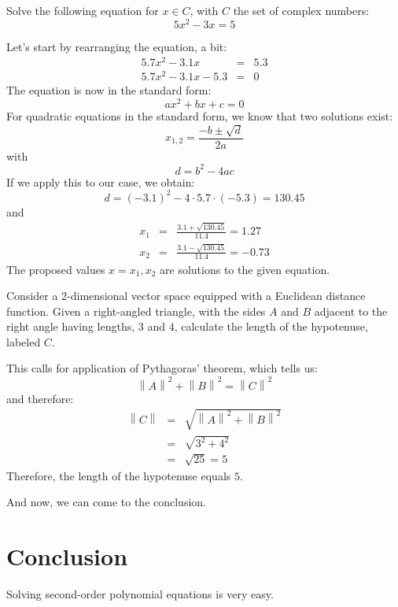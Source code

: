\documentclass[a4paper,10pt]{article}
\begin{document}
\begin{exercises}[columns = 2]

  \begin{exercise}
    \label{ex:1}
    Solve the following equation for $x \in C$, with $C$ the set of
    complex numbers:
    \begin{equation}
      5 x^2 -3 x = 5
    \end{equation}
  \end{exercise}
  \begin{solution}
    Let's start by rearranging the equation, a bit:
    \begin{eqnarray}
      5.7 x^2 - 3.1 x &=& 5.3\\
      5.7 x^2 - 3.1 x -5.3 &=& 0
    \end{eqnarray}
    The equation is now in the standard form:
    \begin{equation}
      a x^2 + b x + c = 0
    \end{equation}
    For quadratic equations in the standard form, we know that two
    solutions exist:
    \begin{equation}
      x_{1,2} = \frac{ -b \pm \sqrt{d}}{2a}
    \end{equation}
    with
    \begin{equation}
      d = b^2 - 4 a c
    \end{equation}
    If we apply this to our case, we obtain:
    \begin{equation}
      d = (-3.1)^2 - 4 \cdot 5.7 \cdot (-5.3) = 130.45
    \end{equation}
    and
    \begin{eqnarray}
      x_1 &=& \frac{3.1 + \sqrt{130.45}}{11.4} = 1.27\\
      x_2 &=& \frac{3.1 - \sqrt{130.45}}{11.4} = -0.73
    \end{eqnarray}
    The proposed values $x = x_1, x_2$ are solutions to the given equation.
  \end{solution}
  \begin{exercise}
    \label{ex:2}
    Consider a 2-dimensional vector space equipped with a Euclidean
    distance function. Given a right-angled triangle, with the sides
    $A$ and $B$ adjacent to the right angle having lengths, $3$ and
    $4$, calculate the length of the hypotenuse, labeled $C$.
  \end{exercise}
  \begin{solution}
    This calls for application of Pythagoras' theorem, which
    tells us:
    \begin{equation}
      \left\|A\right\|^2 + \left\|B\right\|^2 = \left\|C\right\|^2
    \end{equation}
    and therefore:
    \begin{eqnarray}
      \left\|C\right\|
      &=& \sqrt{\left\|A\right\|^2 + \left\|B\right\|^2}\\
      &=& \sqrt{3^2 + 4^2}\\
      &=& \sqrt{25} = 5
    \end{eqnarray}
    Therefore, the length of the hypotenuse equals $5$.
  \end{solution}
\end{exercises}

And now, we can come to the conclusion.
\section{Conclusion}
Solving second-order polynomial equations is very easy.
\end{document}
